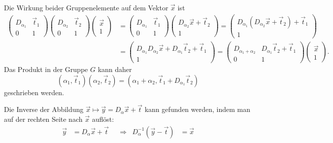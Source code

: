 \begin{loesung}
\begin{teilaufgaben}
\item
Die Wirkung beider Gruppenelemente auf dem Vektor $\vec{x}$ ist
\begin{align*}
\begin{pmatrix}D_{\alpha_1}&\vec{t}_1\\0&1\end{pmatrix}
\begin{pmatrix}D_{\alpha_2}&\vec{t}_2\\0&1\end{pmatrix}
\begin{pmatrix}\vec{x}\\1\end{pmatrix}
&=
\begin{pmatrix}D_{\alpha_1}&\vec{t}_1\\0&1\end{pmatrix}
\begin{pmatrix}D_{\alpha_2}\vec{x}+\vec{t}_2\\1\end{pmatrix}
=
\begin{pmatrix}
D_{\alpha_1}(D_{\alpha_2}\vec{x}+\vec{t}_2)+\vec{t}_1\\1
\end{pmatrix}
\\
&=
\begin{pmatrix}
D_{\alpha_1}D_{\alpha_2}\vec{x} + D_{\alpha_1}\vec{t}_2+\vec{t}_1\\1
\end{pmatrix}
=
\begin{pmatrix}
D_{\alpha_1+\alpha_2}&D_{\alpha_1}\vec{t}_2+\vec{t}_1\\
0&1
\end{pmatrix}
\begin{pmatrix}\vec{x}\\1\end{pmatrix}.
\end{align*}
Das Produkt in der Gruppe $G$ kann daher
\[
(\alpha_1,\vec{t}_1) (\alpha_2,\vec{t}_2)
=
(\alpha_1+\alpha_2,\vec{t}_1+D_{\alpha_1}\vec{t}_2)
\]
geschrieben werden.
\item
Die Inverse der Abbildung $\vec{x}\mapsto \vec{y}=D_\alpha\vec{x}+\vec{t}$
kann gefunden werden, indem man auf der rechten Seite nach $\vec{x}$
auflöst:
\begin{align*}
\vec{y}&=D_\alpha\vec{x}+\vec{t}
&&\Rightarrow&
D_{\alpha}^{-1}( \vec{y}-\vec{t}) &= \vec{x}
\\

\end{align*}
\end{teilaufgaben}
\end{loesung}
